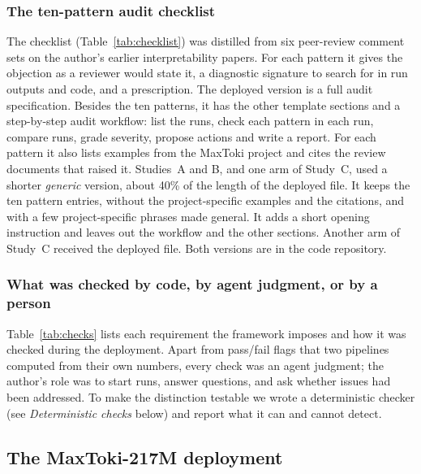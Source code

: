 \subsubsection*{The ten-pattern audit checklist}
The checklist (Table~\ref{tab:checklist}) was distilled from six
peer-review comment sets on the author's earlier interpretability papers.
For each pattern it gives the objection as a reviewer would state it, a
diagnostic signature to search for in run outputs and code, and a
prescription. The deployed version is a full audit specification.
Besides the ten patterns, it has the other template sections and a
step-by-step audit workflow: list the runs, check each pattern in each
run, compare runs, grade severity, propose actions and write a report.
For each pattern it also lists examples from the MaxToki project and cites
the review documents that raised it. Studies~A and B, and one arm of
Study~C, used a shorter \emph{generic} version, about 40\% of the length
of the deployed file. It keeps the ten pattern entries, without the
project-specific examples and the citations, and with a few
project-specific phrases made general. It adds a short opening
instruction and leaves out the workflow and the other sections. Another
arm of Study~C received the deployed file. Both versions are in the code
repository.


\subsubsection*{What was checked by code, by agent judgment, or by a person}
Table~\ref{tab:checks} lists each requirement the framework imposes and
how it was checked during the deployment. Apart from pass/fail flags that
two pipelines computed from their own numbers, every check was an agent
judgment; the author's role was to start runs, answer questions, and ask
whether issues had been addressed. To make the distinction testable we
wrote a deterministic checker (see \emph{Deterministic checks} below) and
report what it can and cannot detect.


\subsection*{The MaxToki-217M deployment}

